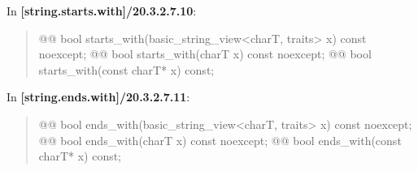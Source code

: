 \documentclass{wg21}
\begin{document}
In \textbf{[string.starts.with]/20.3.2.7.10}:
\begin{quote}
\begin{itemdecl}
@@ bool starts_with(basic_string_view<charT, traits> x) const noexcept;
@@ bool starts_with(charT x) const noexcept;
@@ bool starts_with(const charT* x) const;
\end{itemdecl}
\end{quote}


In \textbf{[string.ends.with]/20.3.2.7.11}:
\begin{quote}
\begin{itemdecl}
@@ bool ends_with(basic_string_view<charT, traits> x) const noexcept;
@@ bool ends_with(charT x) const noexcept;
@@ bool ends_with(const charT* x) const;
\end{itemdecl}
\end{quote}
\end{document}

